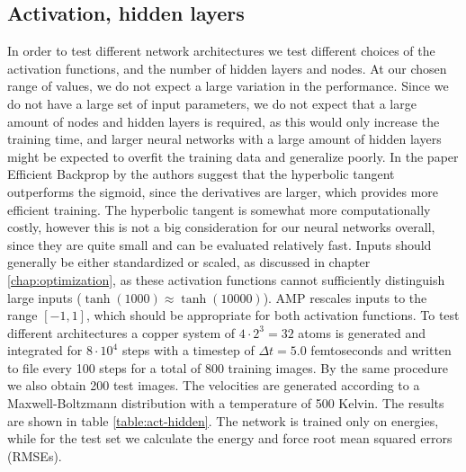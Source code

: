 \subsection{Activation, hidden layers}
In order to test different network architectures
we test different choices of the activation functions, and the number
of hidden layers and nodes.
At our chosen range of values, we do not expect a 
large variation in the performance.
Since we do not have a large set of input parameters, we do not expect
that a large amount of nodes and hidden layers is required, as this would
only increase the training time,
and larger neural networks with a large amount of hidden layers
might be expected to overfit the training data and generalize poorly.
In the paper Efficient Backprop by \parencite[Lecun et al.]{
lecun2012efficient} the authors suggest that the hyperbolic
tangent outperforms the sigmoid, since the derivatives
are larger, which provides more efficient training.
The hyperbolic tangent is somewhat more computationally costly,
however this is not a big consideration for our neural networks
overall, since they are quite small and can be evaluated
relatively fast.
Inputs should generally be either standardized or scaled, 
as discussed in chapter \ref{chap:optimization},
as these activation functions cannot sufficiently distinguish
large inputs ($\tanh(1000) \approx \tanh(10000)$).
AMP rescales inputs to the range $\left[-1, 1\right]$,
which should be appropriate for both activation functions.
To test different architectures a copper system of $4 \cdot 2^3 = 32$
atoms is generated and integrated for $8 \cdot 10^4$ steps
with a timestep of $\Delta t = 5.0$ femtoseconds
and written to file every 100 steps for a total of 800 training images.
By the same procedure we also obtain 200 test images.
The velocities are generated
according to a Maxwell-Boltzmann distribution with a temperature
of 500 Kelvin. The results are shown in table \ref{table:act-hidden}.
The network is trained only on energies, while for the test set
we calculate the energy and force root mean squared errors (RMSEs).

